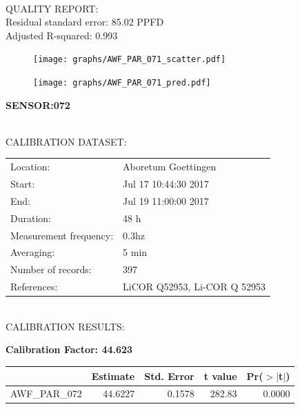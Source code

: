 \documentclass[oneside]{report}
\begin{document}
\hrulefill\\
QUALITY REPORT:\\
Residual standard error: 85.02 PPFD\\
Adjusted R-squared: 0.993



\begin{figure}[H]
  \centering
  \texttt{[image: graphs/AWF\_PAR\_071\_scatter.pdf]}
\end{figure}




\begin{figure}[H]
  \centering
  \texttt{[image: graphs/AWF\_PAR\_071\_pred.pdf]}
\end{figure}

\pagebreak


\begin{center}
\large{\textbf{SENSOR:072}}\\
\end{center}

\hrulefill\\
CALIBRATION DATASET:\\
\begin{table}[h!]
  \centering
  \label{tab:table1}
  \begin{tabular}{ll}
    Location: & Aboretum Goettingen\\ 
    
    
    Start:  & Jul 17 10:44:30 2017 \\
    End:   & Jul 19 11:00:00 2017\\ 
    Duration: & 48 h\\
    Measurement frequency: & 0.3hz\\
    Averaging:  &5 min\\
    Number of records: & 397 \\
    References: & LiCOR Q52953, Li-COR Q 52953 \\
  \end{tabular}
\end{table}

\hrulefill\\
CALIBRATION RESULTS:\\


\begin{center}
\textbf{\large{Calibration Factor: 44.623}}\\
\end{center}
\begin{table}[ht]
\centering
\begin{tabular}{rrrrr}
  \hline
 & Estimate & Std. Error & t value & Pr($>$$|$t$|$) \\ 
  \hline
AWF\_PAR\_072 & 44.6227 & 0.1578 & 282.83 & 0.0000 \\ 
   \hline
\end{tabular}
\end{table}
\end{document}
